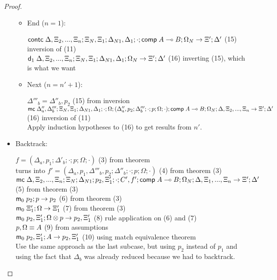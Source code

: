 \begin{proof}
\begin{itemize}
      \begin{itemize}
         \item End ($n = 1$):
         
         $\mathsf{contc} \; \Delta, \Xi_2, ..., \Xi_n; \Xi_N, \Xi_1; \Delta_{N1}, \Delta_1; \cdot; \mathsf{comp} \; A \multimap B; \Omega_N \rightarrow \Xi'; \Delta'$ \hfill (15) \hfill inversion of (11) \\
         $\mathsf{d}_1 \; \Delta, \Xi_2, ..., \Xi_n; \Xi_N, \Xi_1; \Delta_{N1}, \Delta_1; \Omega_N \rightarrow \Xi'; \Delta'$ \hfill (16) inverting (15), which is what we want \\
         
         \item Next ($n = n' + 1$):
         
         $\Delta'''_b = \Delta''_b, p_2$ \hfill (15) from inversion \\
         $\mathsf{mc} \; \Delta''_a, \Delta'''_b; \Xi_N, \Xi_1; \Delta_{N1}, \Delta_1; \cdot; \Omega; (\Delta''_a, p_2; \Delta'''_b; \cdot; p; \Omega; \cdot); \mathsf{comp} \; A \multimap B; \Omega_N; \Delta, \Xi_2, ..., \Xi_n \rightarrow \Xi'; \Delta'$ \hfill (16) inversion of (11) \\
         Apply induction hypotheses to (16) to get results from $n'$.\\ 
      \end{itemize}
      
      \item Backtrack:
      
      $f = (\Delta_a, p_1; \Delta'_b; \cdot; p; \Omega; \cdot)$ \hfill (3) from theorem \\
      turns into $f' = (\Delta_a, p_1, \Delta'''_b, p_2; \Delta''_b; \cdot; p; \Omega; \cdot)$ \hfill (4) from theorem (3) \\
      $\mathsf{mc} \; \Delta, \Xi_2, ..., \Xi_n; \Xi_N; \Delta_{N1}; p_2, \Xi'_1; \cdot; C', f'; \mathsf{comp} \; A \multimap B; \Omega_N; \Delta, \Xi_1, ..., \Xi_n \rightarrow \Xi'; \Delta'$ \hfill (5) from theorem (3) \\
      $\mathsf{m}_0 \; p_2; p \rightarrow p_2$ \hfill (6) from theorem (3) \\
      $\mathsf{m}_0 \; \Xi'_1; \Omega \rightarrow \Xi'_1$ \hfill (7) from theorem (3) \\
      $\mathsf{m}_0 \; p_2, \Xi'_1; \Omega \otimes p \rightarrow p_2, \Xi'_1$ \hfill (8) rule application on (6) and (7) \\
      $p, \Omega \equiv A$ \hfill (9) from assumptions \\
      $\mathsf{m}_0 \; p_2, \Xi'_1 ; A \rightarrow p_2, \Xi'_1$ \hfill (10) using match equivalence theorem \\
      
      Use the same approach as the last subcase, but using $p_2$ instead of $p_1$ and using the fact that $\Delta_b$ was already reduced because we had to backtrack.
   \end{itemize}
   
   
\end{proof}

